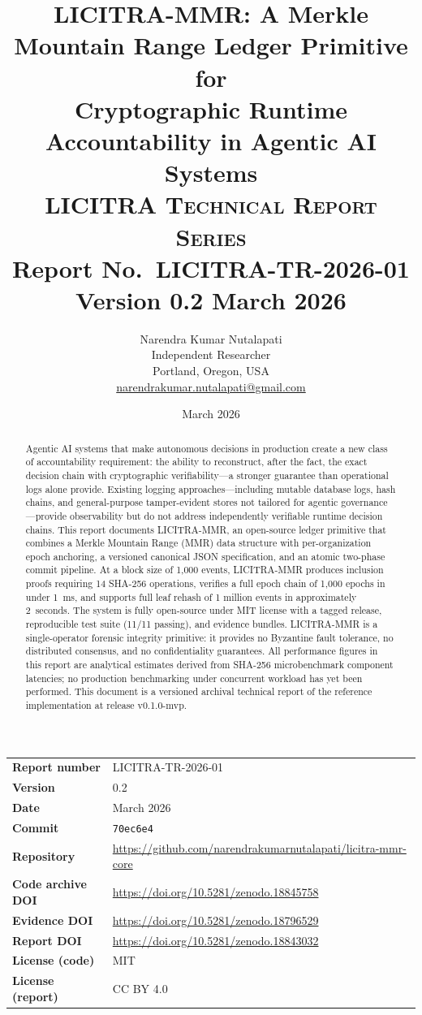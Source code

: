 \documentclass{article}
\title{%
  \textbf{LICITRA-MMR: A Merkle Mountain Range Ledger Primitive for}\\[0.3em]
  \textbf{Cryptographic Runtime Accountability in Agentic AI Systems}\\[16pt]
  \normalsize\textsc{LICITRA Technical Report Series}\\[4pt]
  \normalsize Report No.\ \textbf{LICITRA-TR-2026-01}
  \quad Version \textbf{0.2} \quad March 2026
}
\author{%
  Narendra Kumar Nutalapati\\[0.3em]
  \small Independent Researcher\\
  \small Portland, Oregon, USA\\
  \small \href{mailto:narendrakumar.nutalapati@gmail.com}%
    {narendrakumar.nutalapati@gmail.com}
}
\date{March 2026}
\begin{document}
\maketitle
\thispagestyle{fancy}

\begin{center}
\begin{tabular}{@{}ll@{}}
\toprule
\textbf{Report number}    & LICITRA-TR-2026-01 \\
\textbf{Version}           & 0.2 \\
\textbf{Date}              & March 2026 \\
\textbf{Commit}            & \texttt{70ec6e4} \\
\textbf{Repository}        & \url{https://github.com/narendrakumarnutalapati/licitra-mmr-core} \\
\textbf{Code archive DOI}  & \url{https://doi.org/10.5281/zenodo.18845758} \\
\textbf{Evidence DOI}      & \url{https://doi.org/10.5281/zenodo.18796529} \\
\textbf{Report DOI}        & \url{https://doi.org/10.5281/zenodo.18843032} \\
\textbf{License (code)}    & MIT \\
\textbf{License (report)}  & CC BY 4.0 \\
\bottomrule
\end{tabular}
\end{center}

\bigskip

\begin{abstract}
\noindent
Agentic AI systems that make autonomous decisions in production create a
new class of accountability requirement: the ability to reconstruct, after
the fact, the exact decision chain with cryptographic verifiability---a
stronger guarantee than operational logs alone provide. Existing logging
approaches---including mutable database logs, hash chains, and
general-purpose tamper-evident stores not tailored for agentic
governance---provide observability but do not address independently
verifiable runtime decision chains. This report documents LICITRA-MMR, an
open-source ledger primitive that combines a Merkle Mountain Range (MMR)
data structure with per-organization epoch anchoring, a versioned canonical
JSON specification, and an atomic two-phase commit pipeline. At a block
size of 1,000 events, LICITRA-MMR produces inclusion proofs requiring 14
SHA-256 operations, verifies a full epoch chain of 1,000 epochs in under
1~ms, and supports full leaf rehash of 1 million events in approximately
2~seconds. The system is fully open-source under MIT license with a tagged
release, reproducible test suite (11/11 passing), and evidence bundles.
LICITRA-MMR is a single-operator forensic integrity primitive: it provides
no Byzantine fault tolerance, no distributed consensus, and no
confidentiality guarantees. All performance figures in this report are
analytical estimates derived from SHA-256 microbenchmark component
latencies; no production benchmarking under concurrent workload has yet
been performed. This document is a versioned archival technical report of
the reference implementation at release v0.1.0-mvp.
\end{abstract}
\end{document}
